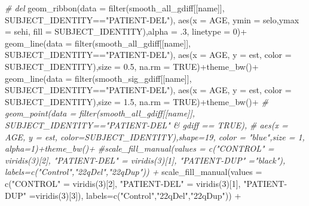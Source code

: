 \documentclass[
]{article}
\newenvironment{Shaded}{\begin{snugshade}}{\end{snugshade}}
\newcommand{\AttributeTok}[1]{\textcolor[rgb]{0.77,0.63,0.00}{#1}}
\newcommand{\CommentTok}[1]{\textcolor[rgb]{0.56,0.35,0.01}{\textit{#1}}}
\newcommand{\ConstantTok}[1]{\textcolor[rgb]{0.00,0.00,0.00}{#1}}
\newcommand{\DecValTok}[1]{\textcolor[rgb]{0.00,0.00,0.81}{#1}}
\newcommand{\FloatTok}[1]{\textcolor[rgb]{0.00,0.00,0.81}{#1}}
\newcommand{\FunctionTok}[1]{\textcolor[rgb]{0.00,0.00,0.00}{#1}}
\newcommand{\NormalTok}[1]{#1}
\newcommand{\OtherTok}[1]{\textcolor[rgb]{0.56,0.35,0.01}{#1}}
\newcommand{\SpecialCharTok}[1]{\textcolor[rgb]{0.00,0.00,0.00}{#1}}
\newcommand{\StringTok}[1]{\textcolor[rgb]{0.31,0.60,0.02}{#1}}
\begin{document}
\begin{Shaded}
\begin{Highlighting}[]
    \CommentTok{\# del}
    \FunctionTok{geom\_ribbon}\NormalTok{(}\AttributeTok{data =} \FunctionTok{filter}\NormalTok{(smooth\_all\_gdiff[[name]], SUBJECT\_IDENTITY}\SpecialCharTok{==}\StringTok{"PATIENT{-}DEL"}\NormalTok{),}
                \FunctionTok{aes}\NormalTok{(}\AttributeTok{x =}\NormalTok{ AGE, }\AttributeTok{ymin =}\NormalTok{ selo,}\AttributeTok{ymax =}\NormalTok{ sehi, }\AttributeTok{fill =}\NormalTok{ SUBJECT\_IDENTITY),}\AttributeTok{alpha =}\NormalTok{ .}\DecValTok{3}\NormalTok{, }\AttributeTok{linetype =} \DecValTok{0}\NormalTok{)}\SpecialCharTok{+}
    \FunctionTok{geom\_line}\NormalTok{(}\AttributeTok{data =} \FunctionTok{filter}\NormalTok{(smooth\_all\_gdiff[[name]], SUBJECT\_IDENTITY}\SpecialCharTok{==}\StringTok{"PATIENT{-}DEL"}\NormalTok{),}
              \FunctionTok{aes}\NormalTok{(}\AttributeTok{x =}\NormalTok{ AGE, }\AttributeTok{y =}\NormalTok{ est, }\AttributeTok{color =}\NormalTok{ SUBJECT\_IDENTITY),}\AttributeTok{size =} \FloatTok{0.5}\NormalTok{, }\AttributeTok{na.rm =} \ConstantTok{TRUE}\NormalTok{)}\SpecialCharTok{+}\FunctionTok{theme\_bw}\NormalTok{()}\SpecialCharTok{+}
    \FunctionTok{geom\_line}\NormalTok{(}\AttributeTok{data =} \FunctionTok{filter}\NormalTok{(smooth\_sig\_gdiff[[name]], SUBJECT\_IDENTITY}\SpecialCharTok{==}\StringTok{"PATIENT{-}DEL"}\NormalTok{),}
              \FunctionTok{aes}\NormalTok{(}\AttributeTok{x =}\NormalTok{ AGE, }\AttributeTok{y =}\NormalTok{ est, }\AttributeTok{color =}\NormalTok{ SUBJECT\_IDENTITY),}\AttributeTok{size =} \FloatTok{1.5}\NormalTok{, }\AttributeTok{na.rm =} \ConstantTok{TRUE}\NormalTok{)}\SpecialCharTok{+}\FunctionTok{theme\_bw}\NormalTok{()}\SpecialCharTok{+}
    \CommentTok{\# geom\_point(data = filter(smooth\_all\_gdiff[[name]], SUBJECT\_IDENTITY=="PATIENT{-}DEL" \& gdiff == TRUE),}
    \CommentTok{\#           aes(x = AGE, y = est, color=SUBJECT\_IDENTITY),shape=19, color = "blue",size = 1, alpha=1)+theme\_bw()+}
    \CommentTok{\#scale\_fill\_manual(values = c("CONTROL" = viridis(3)[2], "PATIENT{-}DEL" = viridis(3)[1], "PATIENT{-}DUP" ="black"), labels=c("Control","22qDel","22qDup")) +}
    \FunctionTok{scale\_fill\_manual}\NormalTok{(}\AttributeTok{values =} \FunctionTok{c}\NormalTok{(}\StringTok{"CONTROL"} \OtherTok{=} \FunctionTok{viridis}\NormalTok{(}\DecValTok{3}\NormalTok{)[}\DecValTok{2}\NormalTok{], }\StringTok{"PATIENT{-}DEL"} \OtherTok{=} \FunctionTok{viridis}\NormalTok{(}\DecValTok{3}\NormalTok{)[}\DecValTok{1}\NormalTok{], }\StringTok{"PATIENT{-}DUP"} \OtherTok{=}\FunctionTok{viridis}\NormalTok{(}\DecValTok{3}\NormalTok{)[}\DecValTok{3}\NormalTok{]), }\AttributeTok{labels=}\FunctionTok{c}\NormalTok{(}\StringTok{"Control"}\NormalTok{,}\StringTok{"22qDel"}\NormalTok{,}\StringTok{"22qDup"}\NormalTok{)) }\SpecialCharTok{+}

\end{Highlighting}
\end{Shaded}
\end{document}
